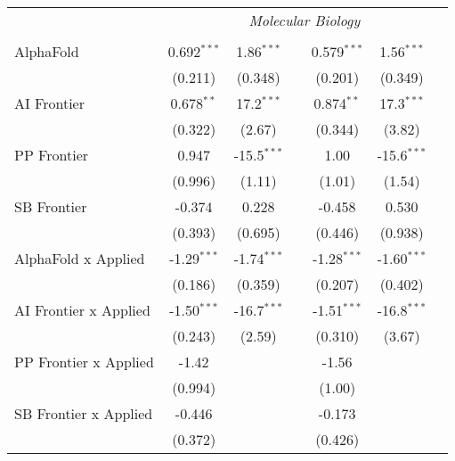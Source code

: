 \begin{tabular}{lcccccc}
 & \multicolumn{6}{c}{\textit{Molecular Biology}} \\ \\
   AlphaFold                      & 0.692$^{***}$ & 1.86$^{***}$  &               & 0.579$^{***}$ & 1.56$^{***}$  &   \\   
                                  & (0.211)       & (0.348)       &               & (0.201)       & (0.349)       &   \\   
   AI Frontier                    & 0.678$^{**}$  & 17.2$^{***}$  &               & 0.874$^{**}$  & 17.3$^{***}$  &   \\   
                                  & (0.322)       & (2.67)        &               & (0.344)       & (3.82)        &   \\   
   PP Frontier                    & 0.947         & -15.5$^{***}$ &               & 1.00          & -15.6$^{***}$ &   \\   
                                  & (0.996)       & (1.11)        &               & (1.01)        & (1.54)        &   \\   
   SB Frontier                    & -0.374        & 0.228         &               & -0.458        & 0.530         &   \\   
                                  & (0.393)       & (0.695)       &               & (0.446)       & (0.938)       &   \\   
   AlphaFold x Applied            & -1.29$^{***}$ & -1.74$^{***}$ &               & -1.28$^{***}$ & -1.60$^{***}$ &   \\   
                                  & (0.186)       & (0.359)       &               & (0.207)       & (0.402)       &   \\   
   AI Frontier x Applied          & -1.50$^{***}$ & -16.7$^{***}$ &               & -1.51$^{***}$ & -16.8$^{***}$ &   \\   
                                  & (0.243)       & (2.59)        &               & (0.310)       & (3.67)        &   \\   
   PP Frontier x Applied          & -1.42         &               &               & -1.56         &               &   \\   
                                  & (0.994)       &               &               & (1.00)        &               &   \\   
   SB Frontier x Applied          & -0.446        &               &               & -0.173        &               &   \\   
                                  & (0.372)       &               &               & (0.426)       &               &   \\   

\end{tabular}
